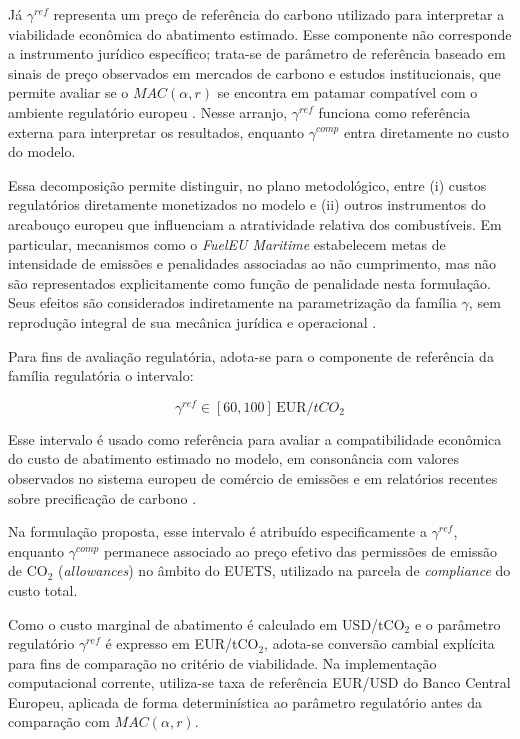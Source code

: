 Já $\gamma^{ref}$ representa um preço de referência do carbono utilizado para interpretar a viabilidade econômica do abatimento estimado. Esse componente não corresponde a instrumento jurídico específico; trata-se de parâmetro de referência baseado em sinais de preço observados em mercados de carbono e estudos institucionais, que permite avaliar se o $MAC(\alpha,r)$ se encontra em patamar compatível com o ambiente regulatório europeu \citep{worldbank2024carbon,euets2023}. Nesse arranjo, $\gamma^{ref}$ funciona como referência externa para interpretar os resultados, enquanto $\gamma^{comp}$ entra diretamente no custo do modelo.

Essa decomposição permite distinguir, no plano metodológico, entre (i) custos regulatórios diretamente monetizados no modelo e (ii) outros instrumentos do arcabouço europeu que influenciam a atratividade relativa dos combustíveis. Em particular, mecanismos como o \emph{FuelEU Maritime} estabelecem metas de intensidade de emissões e penalidades associadas ao não cumprimento, mas não são representados explicitamente como função de penalidade nesta formulação. Seus efeitos são considerados indiretamente na parametrização da família $\gamma$, sem reprodução integral de sua mecânica jurídica e operacional \citep{eu_reg_2023_1805}.

Para fins de avaliação regulatória, adota-se para o componente de referência da família regulatória o intervalo:

\[
\gamma^{ref} \in [60,100]\,\text{EUR}/tCO_2
\]

Esse intervalo é usado como referência para avaliar a compatibilidade econômica do custo de abatimento estimado no modelo, em consonância com valores observados no sistema europeu de comércio de emissões e em relatórios recentes sobre precificação de carbono \citep{euets2023,worldbank2024carbon}. 

Na formulação proposta, esse intervalo é atribuído especificamente a $\gamma^{ref}$, enquanto $\gamma^{comp}$ permanece associado ao preço efetivo das permissões de emissão de CO$_2$ (\emph{allowances}) no âmbito do \gls{EUETS}, utilizado na parcela de \emph{compliance} do custo total.

Como o custo marginal de abatimento é calculado em USD/tCO$_2$ e o parâmetro regulatório $\gamma^{ref}$ é expresso em EUR/tCO$_2$, adota-se conversão cambial explícita para fins de comparação no critério de viabilidade. Na implementação computacional corrente, utiliza-se taxa de referência EUR/USD do Banco Central Europeu, aplicada de forma determinística ao parâmetro regulatório antes da comparação com $MAC(\alpha,r)$.

